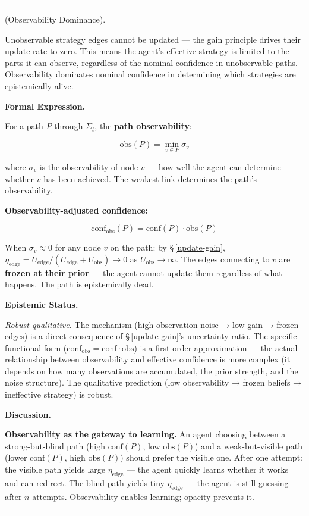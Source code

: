 \documentclass[11pt,oneside]{article}
\newcounter{claim}[section]
\renewcommand{\theclaim}{\thesection.\arabic{claim}}
\newenvironment{segment}[2]{%
  \refstepcounter{claim}%
  \bigskip\noindent\hrule\smallskip
  \noindent{\bfseries #1~\theclaim}\enskip(#2).\par\smallskip
  \noindent\ignorespaces
}{%
  \par\smallskip\noindent\hrule\bigskip
}
\newenvironment{proposition}[1][]{\begin{segment}{Proposition}{#1}}{\end{segment}}
\begin{document}
\begin{proposition}[Observability Dominance]
\label{observability-dominance}
Unobservable strategy edges cannot be updated — the gain principle drives their update rate to zero. This means the agent's effective strategy is limited to the parts it can observe, regardless of the nominal confidence in unobservable paths. Observability dominates nominal confidence in determining which strategies are epistemically alive.



\medskip\noindent\textbf{Formal Expression.}



For a path $P$ through $\Sigma_t$, the \textbf{path observability}:

$$\text{obs}(P) = \min_{v \in P} \sigma_v$$

where $\sigma_v$ is the observability of node $v$ — how well the agent can determine whether $v$ has been achieved. The weakest link determines the path's observability.

\textbf{Observability-adjusted confidence:}

$$\text{conf}_{\text{obs}}(P) = \text{conf}(P) \cdot \text{obs}(P)$$

When $\sigma_v \approx 0$ for any node $v$ on the path: by \S\,\ref{update-gain}, $\eta_{\text{edge}} = U_{\text{edge}} / (U_{\text{edge}} + U_{\text{obs}}) \to 0$ as $U_{\text{obs}} \to \infty$. The edges connecting to $v$ are \textbf{frozen at their prior} — the agent cannot update them regardless of what happens. The path is epistemically dead.


\medskip\noindent\textbf{Epistemic Status.}


\textit{Robust qualitative.} The mechanism (high observation noise → low gain → frozen edges) is a direct consequence of \S\,\ref{update-gain}'s uncertainty ratio. The specific functional form ($\text{conf}_{\text{obs}} = \text{conf} \cdot \text{obs}$) is a first-order approximation — the actual relationship between observability and effective confidence is more complex (it depends on how many observations are accumulated, the prior strength, and the noise structure). The qualitative prediction (low observability → frozen beliefs → ineffective strategy) is robust.


\medskip\noindent\textbf{Discussion.}


\textbf{Observability as the gateway to learning.} An agent choosing between a strong-but-blind path (high $\text{conf}(P)$, low $\text{obs}(P)$) and a weak-but-visible path (lower $\text{conf}(P)$, high $\text{obs}(P)$) should prefer the visible one. After one attempt: the visible path yields large $\eta_{\text{edge}}$ — the agent quickly learns whether it works and can redirect. The blind path yields tiny $\eta_{\text{edge}}$ — the agent is still guessing after $n$ attempts. Observability enables learning; opacity prevents it.


\end{proposition}
\end{document}
